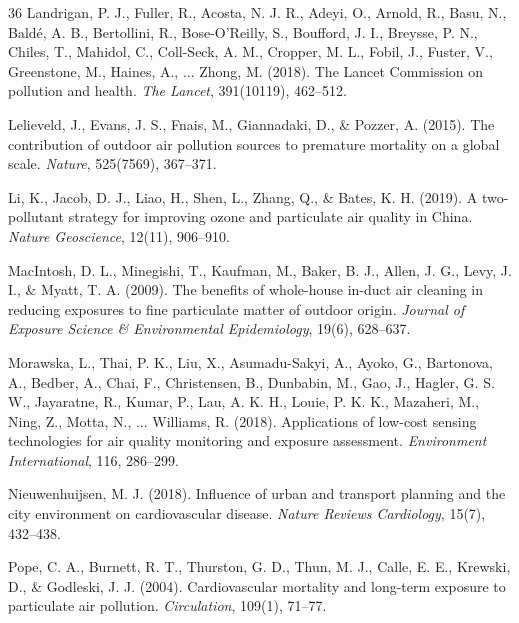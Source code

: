 \documentclass[11pt,a4paper]{article}
\begin{document}
\begin{thebibliography}{36}
Landrigan, P. J., Fuller, R., Acosta, N. J. R., Adeyi, O., Arnold, R., Basu, N., Bald\'e, A. B., Bertollini, R., Bose-O'Reilly, S., Boufford, J. I., Breysse, P. N., Chiles, T., Mahidol, C., Coll-Seck, A. M., Cropper, M. L., Fobil, J., Fuster, V., Greenstone, M., Haines, A., ... Zhong, M. (2018). The Lancet Commission on pollution and health. \textit{The Lancet}, 391(10119), 462--512.

Lelieveld, J., Evans, J. S., Fnais, M., Giannadaki, D., \& Pozzer, A. (2015). The contribution of outdoor air pollution sources to premature mortality on a global scale. \textit{Nature}, 525(7569), 367--371.

Li, K., Jacob, D. J., Liao, H., Shen, L., Zhang, Q., \& Bates, K. H. (2019). A two-pollutant strategy for improving ozone and particulate air quality in China. \textit{Nature Geoscience}, 12(11), 906--910.

MacIntosh, D. L., Minegishi, T., Kaufman, M., Baker, B. J., Allen, J. G., Levy, J. I., \& Myatt, T. A. (2009). The benefits of whole-house in-duct air cleaning in reducing exposures to fine particulate matter of outdoor origin. \textit{Journal of Exposure Science \& Environmental Epidemiology}, 19(6), 628--637.

Morawska, L., Thai, P. K., Liu, X., Asumadu-Sakyi, A., Ayoko, G., Bartonova, A., Bedber, A., Chai, F., Christensen, B., Dunbabin, M., Gao, J., Hagler, G. S. W., Jayaratne, R., Kumar, P., Lau, A. K. H., Louie, P. K. K., Mazaheri, M., Ning, Z., Motta, N., ... Williams, R. (2018). Applications of low-cost sensing technologies for air quality monitoring and exposure assessment. \textit{Environment International}, 116, 286--299.

Nieuwenhuijsen, M. J. (2018). Influence of urban and transport planning and the city environment on cardiovascular disease. \textit{Nature Reviews Cardiology}, 15(7), 432--438.

Pope, C. A., Burnett, R. T., Thurston, G. D., Thun, M. J., Calle, E. E., Krewski, D., \& Godleski, J. J. (2004). Cardiovascular mortality and long-term exposure to particulate air pollution. \textit{Circulation}, 109(1), 71--77.


\end{thebibliography}
\end{document}
